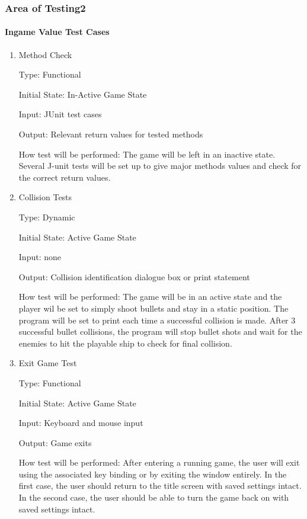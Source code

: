 \documentclass[12pt, titlepage]{article}
\begin{document}
\subsubsection{Area of Testing2}

\paragraph{Ingame Value Test Cases}

\begin{enumerate}

\item{Method Check\\}

Type: Functional

Initial State: In-Active Game State 

Input: JUnit test cases  %

Output: Relevant return values for tested methods 

How test will be performed: The game will be left in an inactive state. Several J-unit tests will be set up to give major methods values and check for the correct return values.

\item{Collision Tests\\}

Type: Dynamic

Initial State: Active Game State 

Input: none

Output: Collision identification dialogue box or print statement 

How test will be performed: The game will be in an active state and the player wil be set to %
simply shoot bullets and stay in a static position. The program will be set to print each time a successful collision is made. After 3 successful bullet collisions, the program will stop bullet shots and wait for the enemies to hit the playable ship to check for final collision. 

\item{Exit Game Test\\}

Type: Functional

Initial State: Active Game State 

Input: Keyboard and mouse input

Output: Game exits 

How test will be performed: After entering a running game, the user will exit using the associated key binding or by exiting the window entirely. In the first case, the user should return to the title screen with saved settings intact. In the second case, the user should be able to turn the game back on with saved settings intact. 


\end{enumerate}
\end{document}
